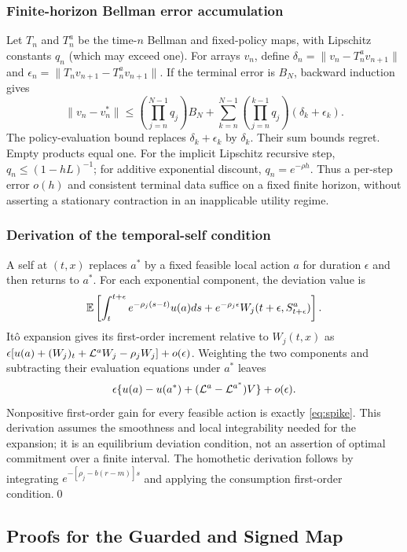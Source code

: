 \subsubsection{Finite-horizon Bellman error accumulation}
Let $T_n$ and $T_n^a$ be the time-$n$ Bellman and fixed-policy maps, with Lipschitz constants $q_n$ (which may exceed one). For arrays $v_n$, define $\delta_n=\|v_n-T_n^av_{n+1}\|$ and $\epsilon_n=\|T_nv_{n+1}-T_n^av_{n+1}\|$. If the terminal error is $B_N$, backward induction gives
\[
 \|v_n-v_n^*\|\leq\left(\prod_{j=n}^{N-1}q_j\right)B_N
 +\sum_{k=n}^{N-1}\left(\prod_{j=n}^{k-1}q_j\right)(\delta_k+\epsilon_k).
\]
The policy-evaluation bound replaces $\delta_k+\epsilon_k$ by $\delta_k$. Their sum bounds regret. Empty products equal one. For the implicit Lipschitz recursive step, $q_n\leq(1-hL)^{-1}$; for additive exponential discount, $q_n=e^{-\rho h}$. Thus a per-step error $o(h)$ and consistent terminal data suffice on a fixed finite horizon, without asserting a stationary contraction in an inapplicable utility regime.

\subsubsection{Derivation of the temporal-self condition}
A self at $(t,x)$ replaces $a^*$ by a fixed feasible local action $a$ for duration $\epsilon$ and then returns to $a^*$. For each exponential component, the deviation value is
\[
 \mathbb E\left[\int_t^{t+\epsilon}e^{-\rho_j(s-t)}u(a)ds
     +e^{-\rho_j\epsilon}W_j(t+\epsilon,S_{t+\epsilon}^{a})\right].
\]
It\^o expansion gives its first-order increment relative to $W_j(t,x)$ as $\epsilon[u(a)+(W_j)_t+\mathcal L^aW_j-\rho_jW_j]+o(\epsilon)$. Weighting the two components and subtracting their evaluation equations under $a^*$ leaves
\[
 \epsilon\{u(a)-u(a^*)+(\mathcal L^a-\mathcal L^{a^*})V\}+o(\epsilon).
\]
Nonpositive first-order gain for every feasible action is exactly \eqref{eq:spike}. This derivation assumes the smoothness and local integrability needed for the expansion; it is an equilibrium deviation condition, not an assertion of optimal commitment over a finite interval. The homothetic derivation follows by integrating $e^{-[\rho_j-b(r-m)]s}$ and applying the consumption first-order condition.\qed

\subsection{Proofs for the Guarded and Signed Map}\label{app:r9proofs}
